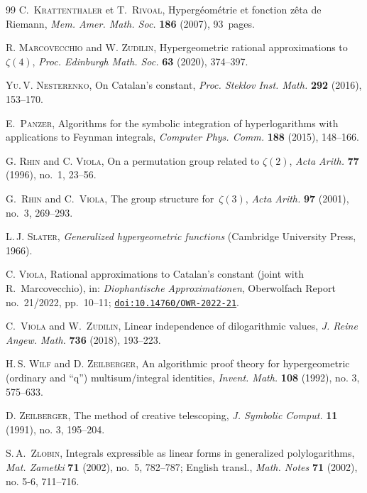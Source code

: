 \documentclass[12pt,reqno]{amsart}
\theoremstyle{remark}
\begin{document}
\begin{thebibliography}{99}
\textsc{C.~Krattenthaler} et \textsc{T.~Rivoal},
Hyperg\'eom\'etrie et fonction z\^eta de Riemann,
\emph{Mem. Amer. Math. Soc.} \textbf{186} (2007), 93~pages. 

\textsc{R. Marcovecchio} and \textsc{W. Zudilin},
Hypergeometric rational approximations to $\zeta(4)$,
\emph{Proc. Edinburgh Math. Soc.} \textbf{63} (2020), 374--397.

\textsc{Yu.\,V. Nesterenko},
On Catalan's constant,
\emph{Proc. Steklov Inst. Math.} \textbf{292} (2016), 153--170.

\textsc{E.~Panzer},
Algorithms for the symbolic integration of hyperlogarithms with applications to Feynman integrals,
\emph{Computer Phys. Comm.} \textbf{188} (2015), 148--166.

\textsc{G. Rhin} and \textsc{C. Viola},
On a permutation group related to $\zeta(2)$,
\emph{Acta Arith.} \textbf{77} (1996), no.~1, 23--56.

\textsc{G.~Rhin} and \textsc{C.~Viola},
The group structure for~$\zeta(3)$,
\emph{Acta Arith.} \textbf{97} (2001), no.~3, 269--293.

\textsc{L.\,J. Slater},
\emph{Generalized hypergeometric functions}
(Cambridge University Press, 1966).

\textsc{C. Viola},
Rational approximations to Catalan’s constant (joint with R.~Marcovecchio),
in: \emph{Diophantische Approximationen}, Oberwolfach Report no.~21/2022, pp.~10--11;
\href{https://doi.org/10.14760/OWR-2022-21}{\texttt{doi:10.14760/OWR-2022-21}}.

\textsc{C.~Viola} and \textsc{W.~Zudilin},
Linear independence of dilogarithmic values,
\emph{J. Reine Angew. Math.} \textbf{736} (2018), 193--223.

\textsc{H.\,S. Wilf} and \textsc{D. Zeilberger},
An algorithmic proof theory for hypergeometric (ordinary and ``q'') multisum/integral identities,
\emph{Invent. Math.} \textbf{108} (1992), no. 3, 575--633.

\textsc{D. Zeilberger},
The method of creative telescoping,
\emph{J. Symbolic Comput.} \textbf{11} (1991), no. 3, 195--204.

\textsc{S.\,A.~Zlobin},
Integrals expressible as linear forms in generalized polylogarithms,
\emph{Mat. Zametki} \textbf{71} (2002), no.~5, 782--787; English transl., \emph{Math. Notes} \textbf{71} (2002), no. 5-6, 711--716.


\end{thebibliography}
\end{document}
